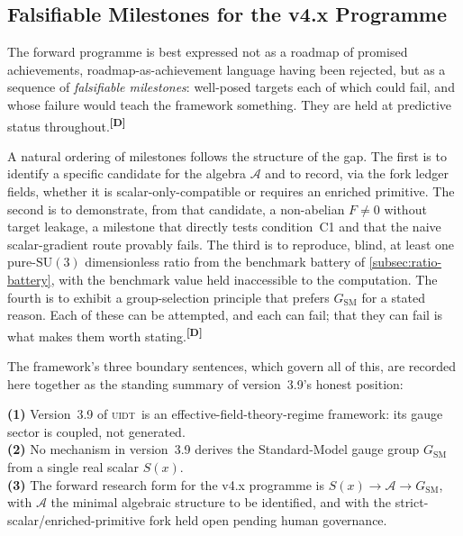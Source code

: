 \documentclass[12pt,a4paper,twoside]{article}
\theoremstyle{plain}
\theoremstyle{definition}
\theoremstyle{remark}
\newcommand{\UIDT}{\textsc{uidt}}
\newcommand{\catmark}[1]{\textsuperscript{\textsf{\textbf{[#1]}}}}
\begin{document}
\subsection{Falsifiable Milestones for the v4.x Programme}
\label{subsec:v4-milestones}

The forward programme is best expressed not as a roadmap of promised achievements, roadmap-as-achievement language having been rejected, but as a sequence of \emph{falsifiable milestones}: well-posed targets each of which could fail, and whose failure would teach the framework something. They are held at predictive status throughout.\catmark{D}

A natural ordering of milestones follows the structure of the gap. The first is to identify a specific candidate for the algebra $\mathcal{A}$ and to record, via the fork ledger fields, whether it is scalar-only-compatible or requires an enriched primitive. The second is to demonstrate, from that candidate, a non-abelian $F \neq 0$ without target leakage, a milestone that directly tests condition~C1 and that the naive scalar-gradient route provably fails. The third is to reproduce, blind, at least one pure-$\mathrm{SU}(3)$ dimensionless ratio from the benchmark battery of \cref{subsec:ratio-battery}, with the benchmark value held inaccessible to the computation. The fourth is to exhibit a group-selection principle that prefers $G_{\mathrm{SM}}$ for a stated reason. Each of these can be attempted, and each can fail; that they can fail is what makes them worth stating.\catmark{D}

The framework's three boundary sentences, which govern all of this, are recorded here together as the standing summary of version~3.9's honest position:

\begin{governancebox}
\textbf{(1)} Version~3.9 of \UIDT\ is an effective-field-theory-regime framework:
its gauge sector is coupled, not generated.\\[0.3em]
\textbf{(2)} No mechanism in version~3.9 derives the Standard-Model gauge group
$G_{\mathrm{SM}}$ from a single real scalar $S(x)$.\\[0.3em]
\textbf{(3)} The forward research form for the v4.x programme is $S(x)\to\mathcal{A}\to G_{\mathrm{SM}}$, with $\mathcal{A}$ the minimal algebraic structure to be identified, and with the strict-scalar/enriched-primitive fork held open pending human governance.
\end{governancebox}
\end{document}
